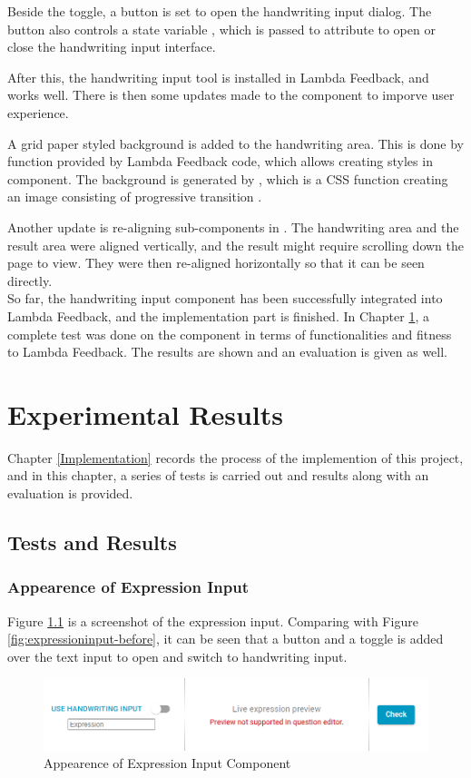\documentclass[12pt,twoside]{report}
\begin{document}
Beside the toggle, a button is set to open the handwriting input dialog. The
button also controls a state variable , which is passed to
attribute  to open or close the handwriting input interface.

After this, the handwriting input tool is installed in Lambda Feedback, and
works well. There is then some updates made to the component to imporve user
experience.

A grid paper styled background is added to the handwriting area. This is done by
 function provided by Lambda Feedback code, which allows
creating styles in component. The background is generated by
, which is a CSS function creating an image consisting of
progressive transition \cite{web:gradientfunction}.

Another update is re-aligning sub-components in . The
handwriting area and the result area were aligned vertically, and the result
might require scrolling down the page to view. They were then re-aligned
horizontally so that it can be seen directly.
\\

So far, the handwriting input component has been successfully integrated into
Lambda Feedback, and the implementation part is finished. In Chapter
\ref{Results}, a complete test was done on the component in terms of
functionalities and fitness to Lambda Feedback. The results are shown and an
evaluation is given as well.



\chapter{Experimental Results}
\label{Results}
Chapter \ref{Implementation} records the process of the implemention of this project, and in this chapter, a series of tests is carried out and results along with an evaluation is provided.

\section{Tests and Results}
\label{tests-results}
\subsection*{Appearence of Expression Input}
Figure \ref{fig:component-appearence} is a screenshot of the expression input.
Comparing with Figure \ref{fig:expressioninput-before}, it can be seen that a
button and a toggle is added over the text input to open and switch to
handwriting input.
\begin{figure}[h]
    \centering
    \includegraphics[width=\linewidth, frame]{figures/component-appearence.png}
    \caption{Appearence of Expression Input Component}
    \label{fig:component-appearence}
\end{figure}
\end{document}
